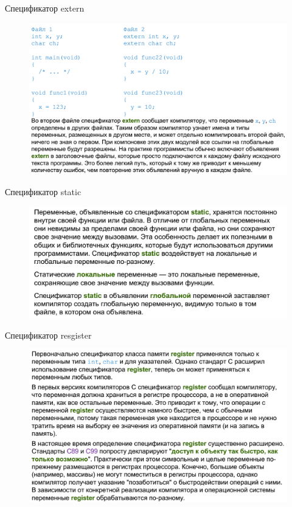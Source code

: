 \documentclass{beamer}
\begin{document}
\begin{frame}{Спецификатор extern}
\begin{figure}[h]
\centering
\includegraphics[scale=0.4]{images/lec02-pic11.png}
\end{figure}
\end{frame}

\begin{frame}{Спецификатор static}
\begin{figure}[h]
\centering
\includegraphics[scale=0.4]{images/lec02-pic12.png}
\end{figure}
\end{frame}

\begin{frame}{Спецификатор resgister}
\begin{figure}[h]
\centering
\includegraphics[scale=0.4]{images/lec02-pic13.png}
\end{figure}
\end{frame}
\end{document}
